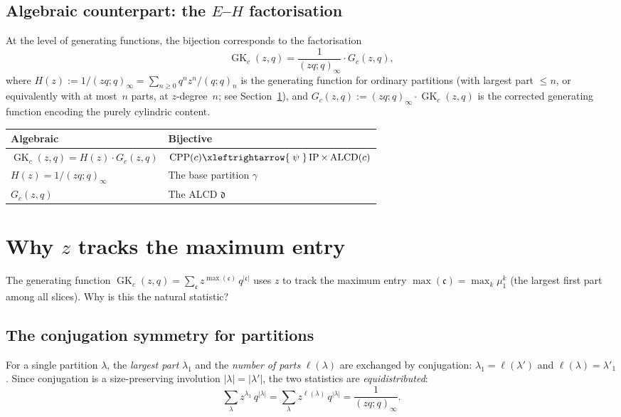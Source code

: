\documentclass[11pt]{article}
\newcommand{\GK}{\operatorname{GK}}
\newcommand{\CPP}{\operatorname{CPP}}
\newcommand{\IP}{\operatorname{IP}}
\newcommand{\ALCD}{\operatorname{ALCD}}
\newcommand{\qpoch}[2]{(#1;#2)_\infty}
\newcommand{\qpochn}[3]{(#1;#2)_{#3}}
\theoremstyle{plain}
\theoremstyle{definition}
\begin{document}
\subsection{Algebraic counterpart: the $E$--$H$ factorisation}

At the level of generating functions, the bijection corresponds to the
factorisation
\begin{equation}\label{eq:EH}
  \GK_c(z,q) = \frac{1}{\qpoch{zq}{q}} \cdot G_c(z,q),
\end{equation}
where $H(z) := 1/\qpoch{zq}{q} = \sum_{n \geq 0} q^n z^n/\qpochn{q}{q}{n}$
is the generating function for ordinary partitions (with largest part
$\leq n$, or equivalently with at most~$n$ parts, at $z$-degree~$n$;
see Section~\ref{sec:why-z-max}), and
$G_c(z,q) := \qpoch{zq}{q} \cdot \GK_c(z,q)$ is the corrected
generating function encoding the purely cylindric content.

\begin{center}
\begin{tabular}{l|l}
\textbf{Algebraic} & \textbf{Bijective} \\ \hline
$\GK_c(z,q) = H(z) \cdot G_c(z,q)$ &
  $\CPP(c) \xleftrightarrow{\;\psi\;} \IP \times \ALCD(c)$ \\[3pt]
$H(z) = 1/\qpoch{zq}{q}$ &
  The base partition $\gamma$ \\[3pt]
$G_c(z,q)$ &
  The ALCD $\mathfrak{d}$
\end{tabular}
\end{center}


\section{Why $z$ tracks the maximum entry}
\label{sec:why-z-max}

The generating function $\GK_c(z,q) = \sum_{\mathfrak{c}} z^{\max(\mathfrak{c})}\,
q^{|\mathfrak{c}|}$ uses $z$ to track the maximum entry
$\max(\mathfrak{c}) = \max_k \mu^k_1$ (the largest first part among all
slices).  Why is this the natural statistic?

\subsection{The conjugation symmetry for partitions}

For a single partition $\lambda$, the \emph{largest part} $\lambda_1$ and
the \emph{number of parts} $\ell(\lambda)$ are exchanged by conjugation:
$\lambda_1 = \ell(\lambda')$ and $\ell(\lambda) = \lambda'_1$.  Since
conjugation is a size-preserving involution $|\lambda| = |\lambda'|$,
the two statistics are \emph{equidistributed}:
\begin{equation}\label{eq:conjugation-symmetry}
  \sum_\lambda z^{\lambda_1}\, q^{|\lambda|}
  = \sum_\lambda z^{\ell(\lambda)}\, q^{|\lambda|}
  = \frac{1}{\qpoch{zq}{q}}.
\end{equation}
\end{document}
